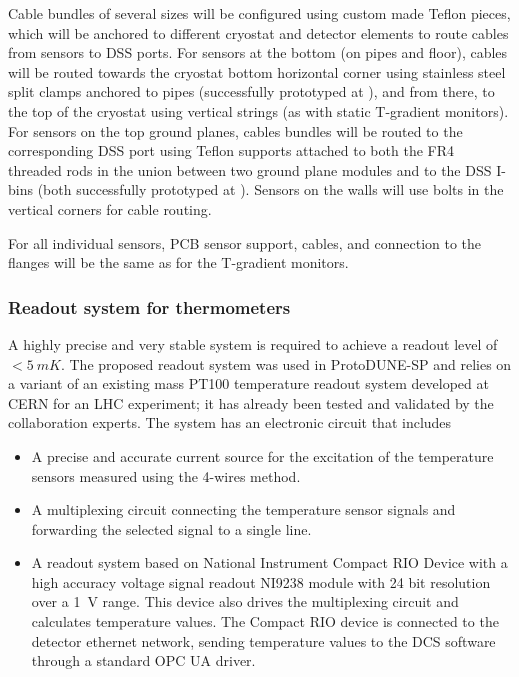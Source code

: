 Cable bundles of several sizes will be configured using custom made Teflon 
pieces,  %
which will be anchored to different cryostat and detector elements to route cables from sensors to DSS ports. For sensors at the bottom (on pipes and floor), cables will be routed towards the cryostat bottom horizontal corner using stainless steel split clamps anchored to pipes (successfully prototyped at ), and from there, to the top of the cryostat using vertical strings (as with static T-gradient monitors). For sensors on the top ground planes, cables bundles will be routed to the corresponding DSS port using Teflon supports attached to both the FR4 threaded rods in the union between two ground plane modules and to the DSS I-bins (both successfully prototyped at ). Sensors on the walls will use bolts in the vertical corners for cable routing. 

For all individual sensors, PCB sensor support, cables, and connection to the flanges will be the same as for the T-gradient monitors. 
  



\subsubsection{Readout system for thermometers}
\label{sec:fdgen-slow-cryo-therm-readout}

A highly precise and very stable system is required to achieve a readout level of $< \SI{5}{mK}$.
The proposed readout system was used in ProtoDUNE-SP and relies on a variant of an existing mass PT100 temperature readout system developed at
CERN for an LHC experiment; it has already been tested and validated by the collaboration experts. The system has an electronic circuit that includes
\begin{itemize}
\item A precise and accurate current source for the excitation of the temperature sensors measured using the 4-wires method. 
\item A multiplexing circuit connecting the temperature sensor signals and forwarding the selected signal to a single line.
\item A readout system based on National Instrument Compact RIO Device  with a high accuracy voltage signal readout NI9238 module with 24 bit resolution over a \SI{1}{V} range. This device also drives the multiplexing circuit and calculates temperature values. The Compact RIO device is connected to the detector ethernet network, sending temperature values to the DCS software through a standard OPC UA driver.

\end{itemize}

